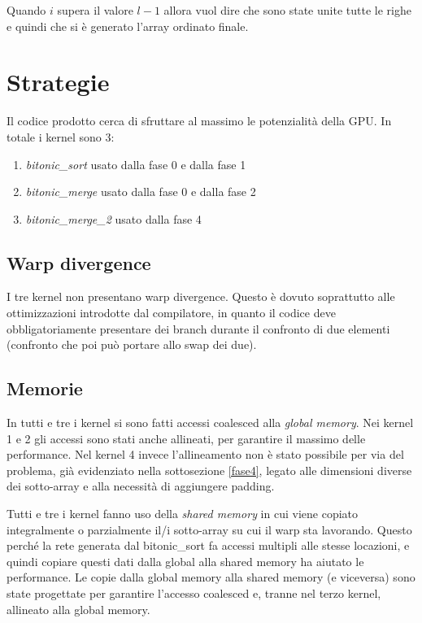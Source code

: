 \documentclass[a4paper, 11pt]{article}
\begin{document}
			Quando $i$ supera il valore $l-1$ allora vuol dire che sono state unite tutte le righe e quindi che si è
			generato l'array ordinato finale.
	\section{Strategie}
		\label{strategie}
		Il codice prodotto cerca di sfruttare al massimo le potenzialità della GPU.
		In totale i kernel sono 3:
		\begin{enumerate}
			\item \emph{bitonic\_sort} usato dalla fase 0 e dalla fase 1
			\item \emph{bitonic\_merge} usato dalla fase 0 e dalla fase 2
			\item \emph{bitonic\_merge\_2} usato dalla fase 4
		\end{enumerate}
		
		\subsection{Warp divergence}
			I tre kernel non presentano warp divergence. 
			Questo è dovuto soprattutto alle ottimizzazioni introdotte dal compilatore, in quanto
			il codice deve obbligatoriamente presentare dei branch durante il confronto di due elementi 
			(confronto che poi può portare allo swap dei due).
		
		\subsection{Memorie}
			In tutti e tre i kernel si sono fatti accessi coalesced alla \emph{global memory}.
			Nei kernel 1 e 2 gli accessi sono stati anche allineati, per garantire il massimo delle performance. Nel kernel 4 
			invece l'allineamento non è stato possibile per via del problema, già evidenziato nella sottosezione \ref{fase4}, 
			legato alle dimensioni diverse dei sotto-array e alla necessità di aggiungere padding.
			
			Tutti e tre i kernel fanno uso della \emph{shared memory} in cui viene copiato integralmente o parzialmente 
			il/i sotto-array su cui il warp sta lavorando. Questo perché la rete generata dal bitonic\_sort fa accessi multipli 
			alle stesse locazioni, e quindi copiare questi dati dalla global alla shared memory ha aiutato le performance.
			Le copie dalla global memory alla shared memory (e viceversa) sono state progettate per garantire l'accesso coalesced e, tranne nel
			terzo kernel, allineato alla global memory. 
			
\end{document}
